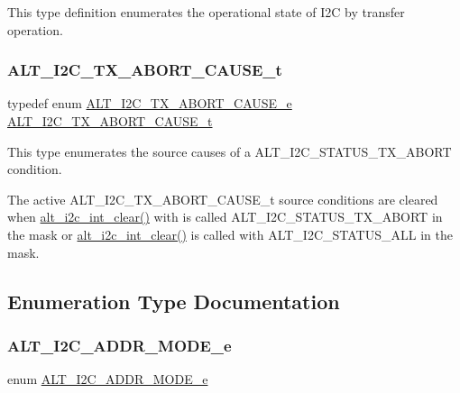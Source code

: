 This type definition enumerates the operational state of I2C by transfer operation. \mbox{\label{group__ALT__I2C_gae7ca3bb5e96b3425588a975987407738}} 
\subsubsection{\texorpdfstring{ALT\_I2C\_TX\_ABORT\_CAUSE\_t}{ALT\_I2C\_TX\_ABORT\_CAUSE\_t}}
{\footnotesize\ttfamily typedef enum \mbox{\hyperlink{group__ALT__I2C_ga321dbe61df714c442640f1c4a908aabf}{A\+L\+T\+\_\+\+I2\+C\+\_\+\+T\+X\+\_\+\+A\+B\+O\+R\+T\+\_\+\+C\+A\+U\+S\+E\+\_\+e}}  \mbox{\hyperlink{group__ALT__I2C_gae7ca3bb5e96b3425588a975987407738}{A\+L\+T\+\_\+\+I2\+C\+\_\+\+T\+X\+\_\+\+A\+B\+O\+R\+T\+\_\+\+C\+A\+U\+S\+E\+\_\+t}}}

This type enumerates the source causes of a A\+L\+T\+\_\+\+I2\+C\+\_\+\+S\+T\+A\+T\+U\+S\+\_\+\+T\+X\+\_\+\+A\+B\+O\+RT condition.

The active A\+L\+T\+\_\+\+I2\+C\+\_\+\+T\+X\+\_\+\+A\+B\+O\+R\+T\+\_\+\+C\+A\+U\+S\+E\+\_\+t source conditions are cleared when \mbox{\hyperlink{group__ALT__I2C__INT_gae00500b27051a82ff75905e777f0e1c8}{alt\+\_\+i2c\+\_\+int\+\_\+clear()}} with is called A\+L\+T\+\_\+\+I2\+C\+\_\+\+S\+T\+A\+T\+U\+S\+\_\+\+T\+X\+\_\+\+A\+B\+O\+RT in the mask or \mbox{\hyperlink{group__ALT__I2C__INT_gae00500b27051a82ff75905e777f0e1c8}{alt\+\_\+i2c\+\_\+int\+\_\+clear()}} is called with A\+L\+T\+\_\+\+I2\+C\+\_\+\+S\+T\+A\+T\+U\+S\+\_\+\+A\+LL in the mask. 

\subsection{Enumeration Type Documentation}
\mbox{\label{group__ALT__I2C_ga9f24389b4997825c99f8e6f8846be810}} 
\subsubsection{\texorpdfstring{ALT\_I2C\_ADDR\_MODE\_e}{ALT\_I2C\_ADDR\_MODE\_e}}
{\footnotesize\ttfamily enum \mbox{\hyperlink{group__ALT__I2C_ga9f24389b4997825c99f8e6f8846be810}{A\+L\+T\+\_\+\+I2\+C\+\_\+\+A\+D\+D\+R\+\_\+\+M\+O\+D\+E\+\_\+e}}}

